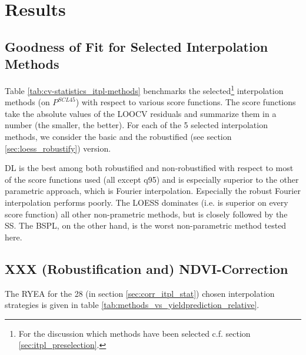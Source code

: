 \chapter{Results}

\section{Goodness of Fit for Selected Interpolation Methods}{
	\label{sec:results_itpl}
	Table \ref{tab:cv-statistics_itpl-methods} benchmarks the selected\footnote{\label{note:selected-IM} For the discussion which methods have been selected c.f. section \ref{sec:itpl_preselection}.} interpolation methods (on $P^{SCL45}$) with respect to various score functions. The score functions take the absolute values of the LOOCV residuals and summarize them in a number (the smaller, the better). For each of the 5 selected interpolation methods, we consider the basic and the robustified (see section \ref{sec:loess_robustify}) version.

	\begin{table}[h]
		\begin{center}
			\caption{Comparing the goodness of fit for selected%
			interpolation methods (on $P^{SCL45}$) measured with the score functions (which take the LOOCV residuals as input) listed in the left column. $q_X$ denotes here the $X\%$ quantile.}
			\scriptsize
			
			\normalsize
			\label{tab:cv-statistics_itpl-methods}
		\end{center}
	\end{table}
	
	DL is the best among both robustified and non-robustified with respect to most of the score functions used (all except q95) and is especially superior to the other parametric approach, which is Fourier interpolation. Especially the robust Fourier interpolation performs poorly. The LOESS dominates (i.e. is superior on every score function) all other non-prametric methods, but is closely followed by the SS. The BSPL, on the other hand, is the worst non-parametric method tested here. 
}


\section{XXX (Robustification and) NDVI-Correction} \label{sec:results_ndvi_corr}
	The RYEA for the 28 (in section \ref{sec:corr_itpl_stat}) chosen interpolation strategies is given in table \ref{tab:methods_vs_yieldprediction_relative}. 


